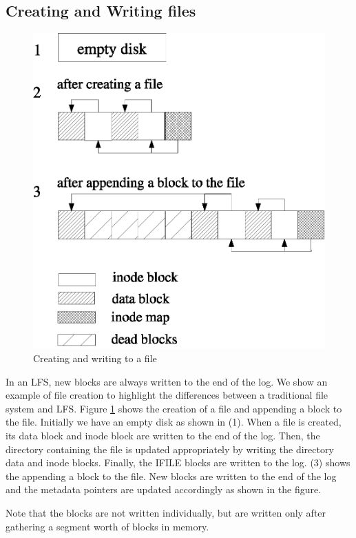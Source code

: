 \documentclass{article}
\begin{document}
\subsection{Creating and Writing files}
\begin{figure}
\centering
\includegraphics[scale=0.7]{lfs2}
\caption{Creating and writing to a file}
\label{create}
\end{figure}


In an LFS, new blocks are always written to the end of the log. We show an
example of file creation to highlight the differences between a traditional
file system and LFS. Figure \ref{create} shows the creation of a file and
appending a block to the file. Initially we have an empty disk as shown in
(1). When a file is created, its data block and inode block are written to the
end of the log.  Then, the directory containing the file is updated
appropriately by writing the directory data and inode blocks. Finally, the
IFILE blocks are written to the log. (3) shows the appending a
block to the file. New blocks are written to the end of the log and the
metadata pointers are updated accordingly as shown in the figure.

Note that the blocks are not written individually, but are written only
after gathering a segment worth of blocks in memory.
\end{document}
